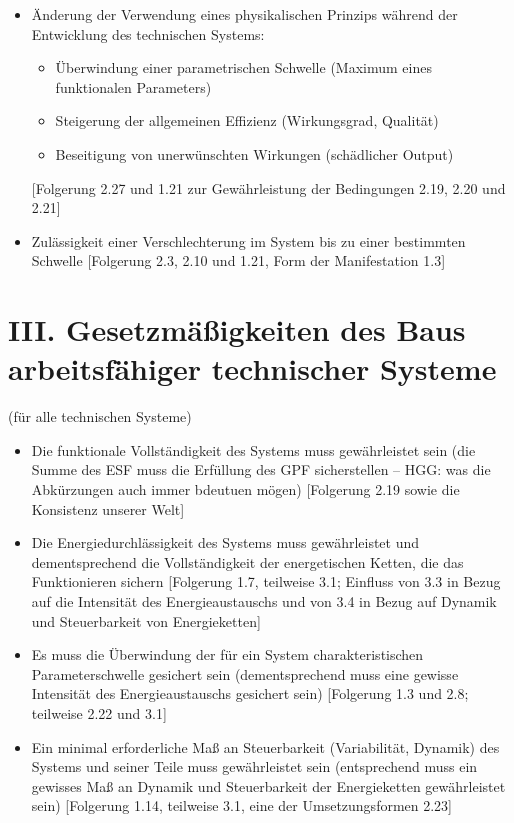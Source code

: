 \documentclass[11pt,a4paper]{article}
\begin{document}
\begin{itemize}
\begin{itemize}
    Idealität.
  \item Die Steigerung der Idealität des Prozesses ist wichtiger als die
    Steigerung der Idealität des technischen Mittels.
  \end{itemize}
  [Folgerung 1.27 und 1.26]
\item[2.28.] Änderung der Verwendung eines physikalischen Prinzips während der
  Entwicklung des technischen Systems:
  \begin{itemize}
  \item Überwindung einer parametrischen Schwelle (Maximum eines funktionalen
    Parameters)
  \item Steigerung der allgemeinen Effizienz (Wirkungsgrad, Qualität)
  \item Beseitigung von unerwünschten Wirkungen (schädlicher Output)
  \end{itemize}
[Folgerung 2.27 und 1.21 zur Gewährleistung der Bedingungen 2.19, 2.20 und
  2.21]
\item[2.29.] Zulässigkeit einer Verschlechterung im System bis zu einer
  bestimmten Schwelle [Folgerung 2.3, 2.10 und 1.21, Form der Manifestation
    1.3]
\end{itemize}
\section*{III. Gesetzmäßigkeiten des Baus arbeitsfähiger technischer Systeme} 
(für alle technischen Systeme)
\begin{itemize}
\item[3.1.] Die funktionale Vollständigkeit des Systems muss gewährleistet
  sein (die Summe des ESF muss die Erfüllung des GPF sicherstellen -- HGG: was
  die Abkürzungen auch immer bdeutuen mögen) [Folgerung 2.19 sowie die
    Konsistenz unserer Welt]
\item[3.2.] Die Energiedurchlässigkeit des Systems muss gewährleistet und
  dementsprechend die Vollständigkeit der energetischen Ketten, die das
  Funktionieren sichern [Folgerung 1.7, teilweise 3.1; Einfluss von 3.3 in
    Bezug auf die Intensität des Energieaustauschs und von 3.4 in Bezug auf
    Dynamik und Steuerbarkeit von Energieketten]
\item[3.3.] Es muss die Überwindung der für ein System charakteristischen
  Parameterschwelle gesichert sein (dementsprechend muss eine gewisse
  Intensität des Energieaustauschs gesichert sein) [Folgerung 1.3 und 2.8;
    teilweise 2.22 und 3.1]
\item[3.4.] Ein minimal erforderliche Maß an Steuerbarkeit (Variabilität,
  Dynamik) des Systems und seiner Teile muss gewährleistet sein (entsprechend
  muss ein gewisses Maß an Dynamik und Steuerbarkeit der Energieketten
  gewährleistet sein) [Folgerung 1.14, teilweise 3.1, eine der
    Umsetzungsformen 2.23]
\end{itemize}
\end{document}
